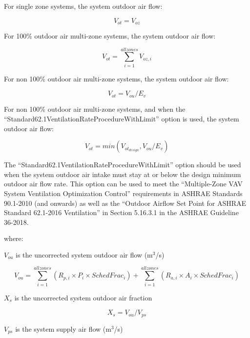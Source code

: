 For single zone systems, the system outdoor air flow:

\begin{equation}
{V_{ot}} = {V_{oz}}
\end{equation}

For 100\% outdoor air multi-zone systems, the system outdoor air flow:

\begin{equation}
{V_{ot}} = \mathop \sum \limits_{i = 1}^{allzones} {V_{oz,i}}
\end{equation}

For non 100\% outdoor air multi-zone systems, the system outdoor air flow:

\begin{equation}
{V_{ot}} = {V_{ou}}/{E_v}
\end{equation}

For non 100\% outdoor air multi-zone systems, and when the ``Standard62.1VentilationRateProcedureWithLimit'' option is used, the system outdoor air flow:

\begin{equation}
{V_{ot}} = min(V_{{ot}_{design}}, {V_{ou}}/{E_v})
\end{equation}

The ``Standard62.1VentilationRateProcedureWithLimit'' option should be used when the system outdoor air intake must stay at or below the design minimum outdoor air flow rate. This option can be used to meet the ``Multiple-Zone VAV System Ventilation Optimization Control'' requirements in ASHRAE Standards 90.1-2010 (and onwards) as well as the ``Outdoor Airflow Set Point for ASHRAE Standard 62.1-2016 Ventilation'' in Section 5.16.3.1 in the ASHRAE Guideline 36-2018.

where:

\({V_{ou}}\) is the uncorrected system outdoor air flow (m\(^3\)/s)

\begin{equation}
{V_{ou}} = \mathop \sum \limits_{i = 1}^{allzones} ({R_{p,i}} \times {P_i} \times {SchedFrac_i}) + \mathop \sum \limits_{i = 1}^{allzones} ({R_{a,i}} \times {A_i} \times {SchedFrac_i})
\end{equation}

\({X_s}\) is the uncorrected system outdoor air fraction

\begin{equation}
{X_s} = {V_{ou}}/{V_{ps}}
\end{equation}

\({V_{ps}}\) is the system supply air flow (m\(^3\)/s)


